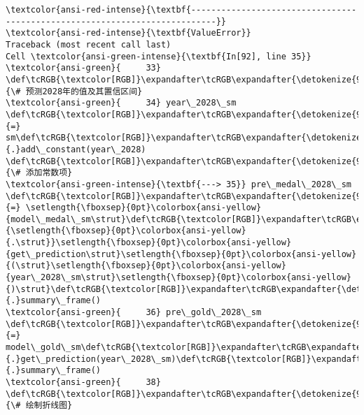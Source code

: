 \documentclass[11pt]{article}
\begin{document}
    \begin{Verbatim}[commandchars=\\\{\}, frame=single, framerule=2mm, rulecolor=\color{outerrorbackground}]
\textcolor{ansi-red-intense}{\textbf{---------------------------------------------------------------------------}}
\textcolor{ansi-red-intense}{\textbf{ValueError}}                                Traceback (most recent call last)
Cell \textcolor{ansi-green-intense}{\textbf{In[92], line 35}}
\textcolor{ansi-green}{     33} \def\tcRGB{\textcolor[RGB]}\expandafter\tcRGB\expandafter{\detokenize{95,135,135}}{\# 预测2028年的值及其置信区间}
\textcolor{ansi-green}{     34} year\_2028\_sm \def\tcRGB{\textcolor[RGB]}\expandafter\tcRGB\expandafter{\detokenize{98,98,98}}{=} sm\def\tcRGB{\textcolor[RGB]}\expandafter\tcRGB\expandafter{\detokenize{98,98,98}}{.}add\_constant(year\_2028)  \def\tcRGB{\textcolor[RGB]}\expandafter\tcRGB\expandafter{\detokenize{95,135,135}}{\# 添加常数项}
\textcolor{ansi-green-intense}{\textbf{---> 35}} pre\_medal\_2028\_sm \def\tcRGB{\textcolor[RGB]}\expandafter\tcRGB\expandafter{\detokenize{98,98,98}}{=} \setlength{\fboxsep}{0pt}\colorbox{ansi-yellow}{model\_medal\_sm\strut}\def\tcRGB{\textcolor[RGB]}\expandafter\tcRGB\expandafter{\detokenize{98,98,98}}{\setlength{\fboxsep}{0pt}\colorbox{ansi-yellow}{.\strut}}\setlength{\fboxsep}{0pt}\colorbox{ansi-yellow}{get\_prediction\strut}\setlength{\fboxsep}{0pt}\colorbox{ansi-yellow}{(\strut}\setlength{\fboxsep}{0pt}\colorbox{ansi-yellow}{year\_2028\_sm\strut}\setlength{\fboxsep}{0pt}\colorbox{ansi-yellow}{)\strut}\def\tcRGB{\textcolor[RGB]}\expandafter\tcRGB\expandafter{\detokenize{98,98,98}}{.}summary\_frame()
\textcolor{ansi-green}{     36} pre\_gold\_2028\_sm \def\tcRGB{\textcolor[RGB]}\expandafter\tcRGB\expandafter{\detokenize{98,98,98}}{=} model\_gold\_sm\def\tcRGB{\textcolor[RGB]}\expandafter\tcRGB\expandafter{\detokenize{98,98,98}}{.}get\_prediction(year\_2028\_sm)\def\tcRGB{\textcolor[RGB]}\expandafter\tcRGB\expandafter{\detokenize{98,98,98}}{.}summary\_frame()
\textcolor{ansi-green}{     38} \def\tcRGB{\textcolor[RGB]}\expandafter\tcRGB\expandafter{\detokenize{95,135,135}}{\# 绘制折线图}


\end{Verbatim}
\end{document}
